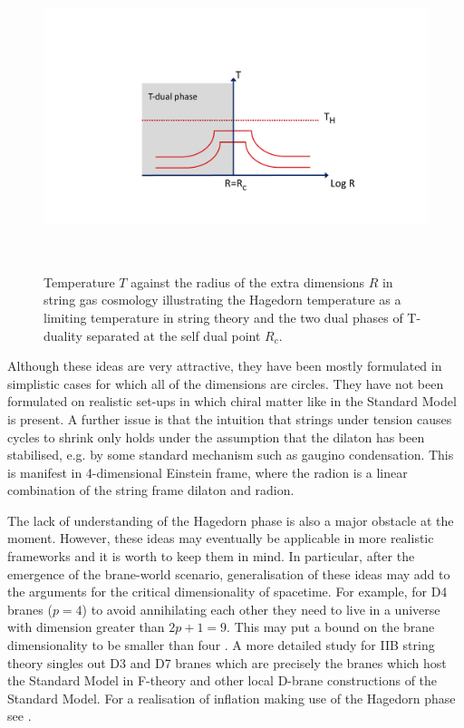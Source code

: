 \begin{figure}[t]
\begin{center}
\includegraphics[width=170mm,height=90mm]{Sections/Figures/Hagedorn.pdf} 
 \vskip -25pt
\caption{Temperature $T$ against the radius of the extra dimensions $R$ in string gas cosmology illustrating the Hagedorn temperature as a limiting temperature in string theory and the two dual phases of T-duality separated at the self dual point $R_c$.} \label{Hagedorn} 
\end{center}
\end{figure}

Although these ideas are very attractive, they have been mostly formulated in  simplistic cases for which all of the dimensions are circles. They have not been formulated on realistic set-ups in which chiral matter like in the Standard Model is present. A further issue is that the intuition that strings under tension causes cycles to shrink only holds under the assumption that the dilaton has been stabilised, e.g. by some standard mechanism such as gaugino condensation. This is manifest in 4-dimensional Einstein frame, where the radion is a linear combination of the string frame dilaton and radion.

The lack of understanding of the Hagedorn phase is also a major obstacle at the moment. However, these ideas may eventually be applicable in more realistic frameworks and it is worth to keep them in mind. In particular, after the emergence of the brane-world scenario, generalisation of these ideas may add to the arguments for the critical dimensionality of spacetime. For example, for D4 branes ($p=4$) to avoid annihilating each other they need to live in a universe with dimension greater than $2p+1=9$. This may put a bound on the brane dimensionality to be smaller than four \cite{Burgess:2001fx,Durrer:2005nz}.  A more detailed study for IIB string theory singles out  D3 and D7 branes \cite{Karch:2005yz} which are precisely the branes which host the Standard Model in F-theory and other local D-brane constructions of the Standard Model. For a realisation of inflation making use of the Hagedorn phase see \cite{Abel:2003jh}.

